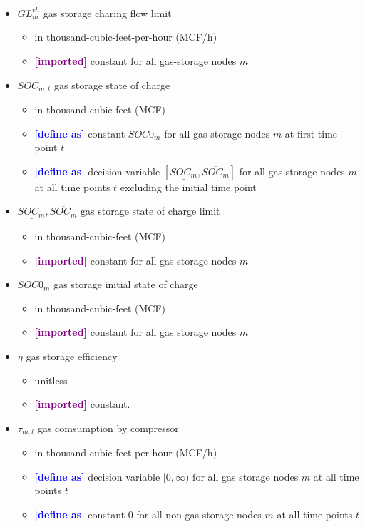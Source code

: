 \documentclass{article}
\newcommand{\lo}[1]{\underline{#1}}
\newcommand{\hi}[1]{\overline{#1}}
\newcommand{\define}{\textcolor{blue}{\textbf{[define as] }}}
\newcommand{\imported}{\textcolor{purple}{\textbf{[imported] }}}
\begin{document}
\begin{itemize}
\item $\hi{GL^{ch}_m}$ gas storage charing flow limit
  \begin{itemize}
  \item in thousand-cubic-feet-per-hour (MCF/h)
  \item \imported constant for all gas-storage nodes $m$
  \end{itemize}

\item $SOC_{m,t}$ gas storage state of charge
  \begin{itemize}
  \item in thousand-cubic-feet (MCF)
  \item \define constant $SOC0_m$ for all gas storage nodes $m$ at first time
    point $t$
  \item \define decision variable $[\lo{SOC_m}, \hi{SOC_m}]$ for all gas storage
    nodes $m$ at all time points $t$ excluding the initial time point
  \end{itemize}

\item $\lo{SOC_m}, \hi{SOC_m}$ gas storage state of charge limit
  \begin{itemize}
  \item in thousand-cubic-feet (MCF)
  \item \imported constant for all gas storage nodes $m$
  \end{itemize}

\item $SOC0_m$ gas storage initial state of charge
  \begin{itemize}
  \item in thousand-cubic-feet (MCF)
  \item \imported constant for all gas storage nodes $m$
  \end{itemize}

\item $\eta$ gas storage efficiency
  \begin{itemize}
  \item unitless
  \item \imported constant.
  \end{itemize}

\item $\tau_{m,t}$ gas comsumption by compressor
  \begin{itemize}
  \item in thousand-cubic-feet-per-hour (MCF/h)
  \item \define decision variable $[0, \infty)$ for all gas storage nodes $m$ at
    all time points $t$
  \item \define constant $0$ for all non-gas-storage nodes $m$ at all time
    points $t$
  \end{itemize}


\end{itemize}
\end{document}

